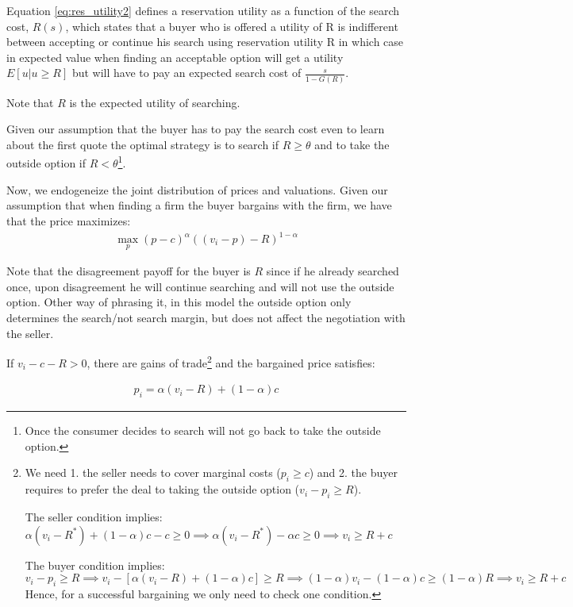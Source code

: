 \documentclass[12pt]{article}
\theoremstyle{plain}
\theoremstyle{plain}
\begin{document}
Equation \ref{eq:res_utility2} defines a reservation utility as a function of the search cost, $R(s)$, which states that a buyer who is offered a utility of R is indifferent between accepting or continue his search using reservation utility R in which case in expected value when finding an acceptable option will get a utility $E[u|u\geq R]$ but will have to pay an expected search cost of $\frac{s}{1-G(R)}$. 


Note that $R$ is the expected utility of searching. 

Given our assumption that the buyer has to pay the search cost even to learn about the first quote the optimal strategy is to search if  
$ R\geq \theta $ and to take the outside option if $R<\theta$\footnote{Once the consumer decides to search will not go back to take the outside option.}. 

Now, we endogeneize the joint distribution of prices and valuations. Given our assumption that when finding a firm the buyer bargains with the firm, we have that the price maximizes: 
\begin{align*}
    \max_p (p-c)^\alpha ((v_i-p) - R)^{1-\alpha}
\end{align*}

Note that the disagreement payoff for the buyer is $R$ since if he already searched once, upon disagreement he will continue searching and will not use the outside option. Other way of phrasing it, in this model the outside option only determines the search/not search margin, but does not affect the negotiation with the seller. 


If $v_i - c- R> 0$, there are gains of trade\footnote{We need 1. the seller needs to cover marginal costs ($p_i\geq c$) and 2. the buyer requires to prefer the deal to taking the outside option ($v_i-p_i\geq R$). 

The seller condition implies: $\alpha (v_i - R^*)+ (1-\alpha)c - c\geq 0 \implies \alpha (v_i - R^*)-\alpha c \geq 0  \implies v_i \geq  R+  c$ 

The buyer condition implies: 
$v_i-p_i\geq R \implies v_i- [\alpha (v_i - R)+ (1-\alpha)c ]\geq R \implies (1- \alpha) v_i-  (1-\alpha)c \geq (1-\alpha) R \implies  v_i \geq  R+c$
Hence, for a successful bargaining we only need to check one condition. 
} and the bargained price satisfies: 


\begin{align}\label{eq:bargained_prices}
    p_i=\alpha (v_i - R)+ (1-\alpha)c 
\end{align}
\end{document}
